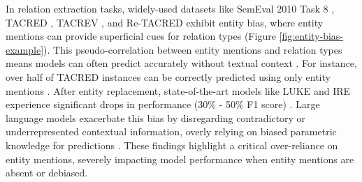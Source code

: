 \documentclass[letterpaper]{article} %
\begin{document}

In relation extraction tasks, widely-used datasets like SemEval 2010 Task 8 \cite{hendrickx2010semeval}, TACRED \cite{zhang2017position}, TACREV \cite{alt2020tacred}, and Re-TACRED \cite{stoica2021re} exhibit entity bias, where entity mentions can provide superficial cues for relation types (Figure \ref{fig:entity-bias-example}). This pseudo-correlation between entity mentions and relation types means models can often predict accurately without textual context \cite{zhang2018graph,peng2020learning}. For instance, over half of TACRED instances can be correctly predicted using only entity mentions \cite{wang2022should}. After entity replacement, state-of-the-art models like LUKE \cite{yamada2020luke} and IRE \cite{zhou2022improved} experience significant drops in performance (30\% - 50\% F1 score) \cite{wang2023fragile}. Large language models exacerbate this bias by disregarding contradictory or underrepresented contextual information, overly relying on biased parametric knowledge \cite{longpre2021entity} for predictions \cite{wang2023causal}. These findings highlight a critical over-reliance on entity mentions, severely impacting model performance when entity mentions are absent or debiased.
\end{document}

